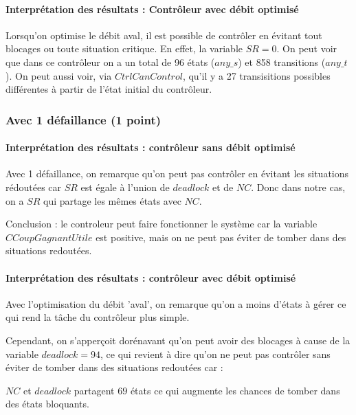 \documentclass[a4paper]{book}
\begin{document}
\paragraph{Interprétation des résultats : Contrôleur avec débit optimisé}

Lorsqu'on optimise le débit aval, il est possible de contrôler en évitant tout blocages ou toute situation critique. En effet, la variable $SR = 0$.
On peut voir que dans ce contrôleur on a un total de 96 états ($any\_s$) et 858 transitions ($any\_t$). On peut aussi voir, via $CtrlCanControl$, qu'il y a 27 transisitions possibles différentes à partir de l'état initial du contrôleur.

\subsubsection{Avec 1 défaillance (1 point)}


%
%
%
\paragraph{Interprétation des résultats : contrôleur sans débit optimisé}
Avec 1 défaillance, on remarque qu'on peut pas contrôler en évitant les situations rédoutées car $SR$ est égale à l'union de $deadlock$ et de $NC$.
Donc dans notre cas, on a $SR$ qui partage les mêmes états avec $NC$.

Conclusion : le controleur peut faire fonctionner le système car la variable $CCoupGagnantUtile$ est positive, mais on ne peut pas éviter de tomber dans des situations redoutées.

\paragraph{Interprétation des résultats : contrôleur avec débit optimisé}
Avec l'optimisation du débit 'aval', on remarque qu'on a moins d'états à gérer ce qui rend la tâche du contrôleur plus simple.

Cependant, on s'apperçoit dorénavant qu'on peut avoir des blocages à cause de la variable $deadlock = 94$, ce qui revient à dire qu'on ne peut pas contrôler sans éviter de tomber dans des situations redoutées car :

$NC$ et $deadlock$ partagent $69$ états ce qui augmente les chances de tomber dans des états bloquants.
\end{document}
